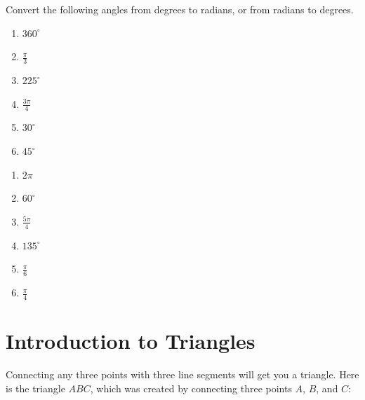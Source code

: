 \begin{Exercise}[label = radians]
Convert the following angles from degrees to radians, or from radians to degrees. 
\begin{enumerate}
\item $360^\circ$
\item $\frac{\pi}{3}$
\item $225^\circ$
\item $\frac{3\pi}{4}$
\item $30^\circ$
\item $45^\circ$
\end{enumerate}
\end{Exercise}

\begin{Answer}[ref = radians]
\begin{enumerate}
\item $2\pi$
\item $60^\circ$
\item $\frac{5\pi}{4}$
\item $135^\circ$
\item $\frac{\pi}{6}$
\item $\frac{\pi}{4}$
\end{enumerate}
\end{Answer}


\section{Introduction to Triangles}
Connecting any three points with three line segments will get you a
triangle. Here is the triangle $ABC$, which was created by connecting three points $A$, $B$, and $C$:


